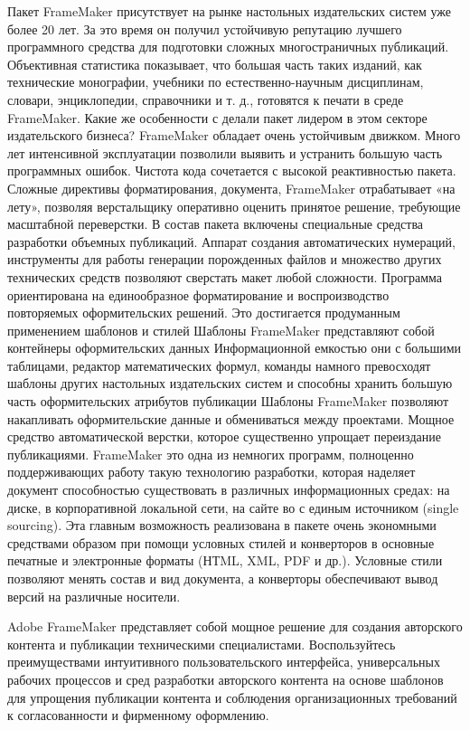\documentclass[a4paper,12pt]{article} %
\begin{document}
 Пакет FrameMaker присутствует на рынке настольных издательских систем уже более 20 лет. За это время он получил устойчивую репутацию лучшего программного средства для подготовки сложных многостраничных публикаций. Объективная статистика показывает, что большая часть таких изданий, как технические монографии, учебники по естественно-научным дисциплинам, словари, энциклопедии, справочники и т. д., готовятся к печати в среде FrameMaker. Какие же особенности с делали пакет лидером в этом секторе издательского бизнеса? FrameMaker обладает очень устойчивым движком. Много лет интенсивной эксплуатации позволили выявить и устранить большую часть программных ошибок. Чистота кода сочетается с высокой реактивностью пакета. Сложные директивы форматирования, документа, FrameMaker отрабатывает «на лету», позволяя верстальщику оперативно оценить принятое решение, требующие масштабной переверстки. В состав пакета включены специальные средства разработки объемных публикаций. Аппарат создания автоматических нумераций, инструменты для работы генерации порожденных файлов и множество других технических средств позволяют сверстать макет любой сложности. Программа ориентирована на единообразное форматирование и воспроизводство повторяемых оформительских решений. Это достигается продуманным применением шаблонов и стилей Шаблоны FrameMaker представляют собой контейнеры оформительских данных Информационной емкостью они с большими таблицами, редактор математических формул, команды намного превосходят шаблоны других настольных издательских систем и способны хранить большую часть оформительских атрибутов публикации Шаблоны FrameMaker позволяют накапливать оформительские данные и обмениваться  между проектами. Мощное средство автоматической верстки, которое существенно упрощает переиздание публикациями. 
         FrameMaker это одна из немногих программ, полноценно поддерживающих работу такую технологию разработки, которая наделяет документ способностью существовать в различных информационных средах: на диске, в корпоративной локальной сети, на сайте во с единым источником (single sourcing). Эта главным возможность реализована в пакете очень экономными средствами образом при помощи условных стилей и конверторов в основные печатные и электронные форматы (НТML, XML, PDF и др.). Условные стили позволяют менять состав и вид документа, а конверторы обеспечивают вывод версий на различные носители. 

        Adobe FrameMaker представляет собой мощное решение для создания авторского контента и публикации техническими специалистами.           Воспользуйтесь преимуществами интуитивного пользовательского интерфейса, универсальных рабочих процессов и сред разработки авторского контента на основе шаблонов для упрощения публикации контента и соблюдения организационных требований к согласованности и фирменному оформлению.
\end{document}
